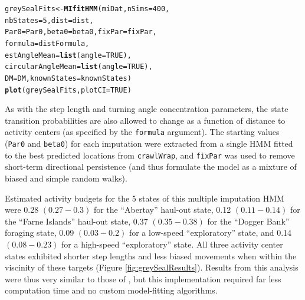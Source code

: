 \documentclass[12pt]{article}\usepackage[]{graphicx}\usepackage[]{color}
\makeatletter
\newcommand{\hlnum}[1]{\textcolor[rgb]{0.686,0.059,0.569}{#1}}%
\newcommand{\hlstd}[1]{\textcolor[rgb]{0.345,0.345,0.345}{#1}}%
\newcommand{\hlkwb}[1]{\textcolor[rgb]{0.69,0.353,0.396}{#1}}%
\newcommand{\hlkwc}[1]{\textcolor[rgb]{0.333,0.667,0.333}{#1}}%
\newcommand{\hlkwd}[1]{\textcolor[rgb]{0.737,0.353,0.396}{\textbf{#1}}}%
\newenvironment{kframe}{%
 \def\at@end@of@kframe{}%
 \ifinner\ifhmode%
  \def\at@end@of@kframe{\end{minipage}}%
  \begin{minipage}{\columnwidth}%
 \fi\fi%
 \def\FrameCommand##1{\hskip\@totalleftmargin \hskip-\fboxsep
 \colorbox{shadecolor}{##1}\hskip-\fboxsep
     \hskip-\linewidth \hskip-\@totalleftmargin \hskip\columnwidth}%
 \MakeFramed {\advance\hsize-\width
   \@totalleftmargin\z@ \linewidth\hsize
   \@setminipage}}%
 {\par\unskip\endMakeFramed%
 \at@end@of@kframe}
\newenvironment{knitrout}{}{} %
\makeatother
\begin{document}
\begin{knitrout}
\color{fgcolor}\begin{kframe}
\begin{alltt}
\hlstd{greySealFits} \hlkwb{<-} \hlkwd{MIfitHMM}\hlstd{(miDat,} \hlkwc{nSims} \hlstd{=} \hlnum{400}\hlstd{,}
                         \hlkwc{nbStates} \hlstd{=} \hlnum{5}\hlstd{,} \hlkwc{dist} \hlstd{= dist,}
                         \hlkwc{Par0} \hlstd{= Par0,} \hlkwc{beta0} \hlstd{= beta0,} \hlkwc{fixPar} \hlstd{= fixPar,}
                         \hlkwc{formula} \hlstd{= distFormula,}
                         \hlkwc{estAngleMean} \hlstd{=} \hlkwd{list}\hlstd{(}\hlkwc{angle}\hlstd{=}\hlnum{TRUE}\hlstd{),}
                         \hlkwc{circularAngleMean} \hlstd{=} \hlkwd{list}\hlstd{(}\hlkwc{angle}\hlstd{=}\hlnum{TRUE}\hlstd{),}
                         \hlkwc{DM} \hlstd{= DM,} \hlkwc{knownStates} \hlstd{= knownStates)}
\hlkwd{plot}\hlstd{(greySealFits,} \hlkwc{plotCI} \hlstd{=} \hlnum{TRUE}\hlstd{)}
\end{alltt}
\end{kframe}
\end{knitrout}
As with the step length and turning angle concentration parameters, the state transition probabilities are also allowed to change as a function of distance to activity centers (as specified by the \verb|formula| argument). The starting values (\verb|Par0| and \verb|beta0|) for each imputation were extracted from a single HMM fitted to the best predicted locations from \verb|crawlWrap|, and \verb|fixPar| was used to remove short-term directional persistence (and thus formulate the model as a mixture of biased and simple random walks). 

Estimated activity budgets for the 5 states of this multiple imputation HMM were 0.28 $(0.27-0.3)$ for the ``Abertay'' haul-out state, 0.12 $(0.11-0.14)$ for the ``Farne Islands'' haul-out state, 0.37 $(0.35-0.38)$ for the ``Dogger Bank'' foraging state, 0.09 $(0.03-0.2)$ for a low-speed ``exploratory'' state, and 0.14 $(0.08-0.23)$ for a high-speed ``exploratory'' state. All three activity center states exhibited shorter step lengths and less biased movements when within the viscinity of these targets (Figure \ref{fig:greySealResults}). Results from this analysis were thus very similar to those of \cite{McClintockEtAl2012}, but this implementation required far less computation time and no custom model-fitting algorithms. 
\end{document}

